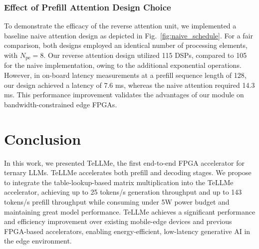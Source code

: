 \documentclass[sigconf]{acmart}
\begin{document}
\subsubsection{Effect of Prefill Attention Design Choice}\label{SEC:ABLATION_ATTENTION}
To demonstrate the efficacy of the reverse attention unit, we implemented a baseline naive attention design as depicted in Fig.~\ref{fig:naive_schedule}. For a fair comparison, both designs employed an identical number of processing elements, with $N_{\text{pe}} = 8$. Our reverse attention design utilized 115 DSPs, compared to 105 for the naive implementation, owing to the additional exponential operations. However, in on-board latency measurements at a prefill sequence length of 128, our design achieved a latency of 7.6 ms, whereas the naive attention required 14.3 ms. This performance improvement validates the advantages of our module on bandwidth-constrained edge FPGAs. 




\section{Conclusion}
In this work, we presented TeLLMe, the first end-to-end FPGA accelerator for ternary LLMs. TeLLMe accelerates both prefill and decoding stages. 
We propose to integrate the table-lookup-based matrix multiplication into the TeLLMe accelerator, achieving up to 25 tokens/s generation throughput and up to 143 tokens/s prefill throughput while consuming under 5W power budget and maintaining great model performance. TeLLMe achieves a significant performance and efficiency improvement over existing mobile-edge devices and previous FPGA-based accelerators, 
enabling energy-efficient, low-latency generative AI in the edge environment.
\end{document}
